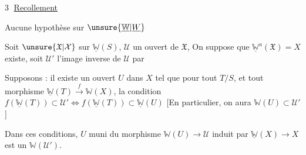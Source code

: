\textcircled{3} \uline{Recollement}

Aucune hypothèse sur $\unsure{\underline{\mathbb W}|\underline W}$

\uline{ } Soit $\unsure{\mathfrak X|\mathcal X}$ sur $\underline{\mathbb W}(S)$,  $\mathcal U$ un ouvert de $\mathfrak X$, On suppose que $\underline{\mathbb W}^a(\mathfrak X)=X$ existe, soit $\mathcal U'$ l'image inverse de $\mathcal U$ par

Supposons : \inserted{\textcircled{$\alpha$}} il existe un ouvert $U$ dans $X$ tel que pour tout $T/S$, et tout morphisme $\underline{\mathbb W}(T)\xrightarrow f\mathbb W(X)$, la condition $f(\underline{\mathbb W}(T))\subset\mathcal U'\Longleftrightarrow f(\underline{\mathbb W}(T))\subset\underline{\mathbb W}(U)$ [En particulier, on aura $\mathbb W(U)\subset\mathcal U'$]

Dans ces conditions, $U$ muni du morphisme $\mathbb W(U)\longrightarrow\mathcal U$ induit par $\underline{\mathbb W}(X)\to X$ est un $\mathbb W(\mathcal U')$.

